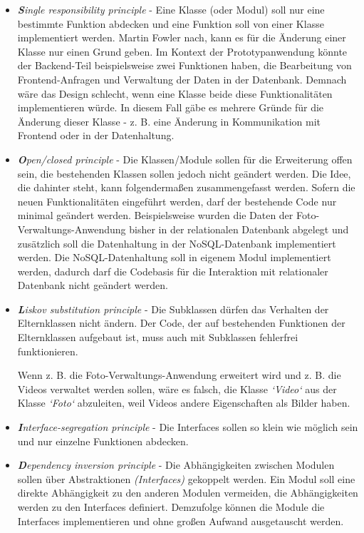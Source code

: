 \begin{itemize}

\item \textit{\textbf{S}ingle responsibility principle} - Eine Klasse (oder Modul) soll nur eine bestimmte Funktion abdecken und eine Funktion soll von einer Klasse implementiert werden. Martin Fowler nach, kann es für die Änderung einer Klasse nur einen Grund geben. Im Kontext der Prototypanwendung könnte der Backend-Teil beispielsweise zwei Funktionen haben, die Bearbeitung von Frontend-Anfragen und Verwaltung der Daten in der Datenbank. Demnach wäre das Design schlecht, wenn eine Klasse beide diese Funktionalitäten implementieren würde. In diesem Fall gäbe es mehrere Gründe für die Änderung dieser Klasse - z. B. eine Änderung in Kommunikation mit Frontend oder in der Datenhaltung.

\item \textit{\textbf{O}pen/closed principle} - Die Klassen/Module sollen für die Erweiterung offen sein, die bestehenden Klassen sollen jedoch nicht geändert werden. Die Idee, die dahinter steht, kann folgendermaßen zusammengefasst werden. Sofern die neuen Funktionalitäten eingeführt werden, darf der bestehende Code nur minimal geändert werden. Beispielsweise wurden die Daten der Foto-Verwaltungs-Anwendung bisher in der relationalen Datenbank abgelegt und zusätzlich soll die Datenhaltung in der NoSQL-Datenbank implementiert werden. Die NoSQL-Datenhaltung soll in eigenem Modul implementiert werden, dadurch darf die Codebasis für die Interaktion mit relationaler Datenbank nicht geändert werden. 

\item \textit{\textbf{L}iskov substitution principle} - Die Subklassen dürfen das Verhalten der Elternklassen nicht ändern. Der Code, der auf bestehenden Funktionen der Elternklassen aufgebaut ist, muss auch mit Subklassen fehlerfrei funktionieren.

Wenn z. B. die Foto-Verwaltungs-Anwendung erweitert wird und z. B. die Videos verwaltet werden sollen, wäre es falsch, die Klasse \textit{`Video`} aus der Klasse \textit{`Foto`} abzuleiten, weil Videos andere Eigenschaften als Bilder haben.

\item \textit{\textbf{I}nterface-segregation principle} - Die Interfaces sollen so klein wie möglich sein und nur einzelne Funktionen abdecken.

\item \textit{\textbf{D}ependency inversion principle} - Die Abhängigkeiten zwischen Modulen sollen über Abstraktionen \textit{(Interfaces)} gekoppelt werden. Ein Modul soll eine direkte Abhängigkeit zu den anderen Modulen vermeiden, die Abhängigkeiten werden zu den Interfaces definiert. Demzufolge können die Module die Interfaces implementieren und ohne großen Aufwand ausgetauscht werden. 


\end{itemize}
